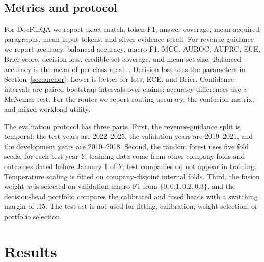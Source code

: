 \documentclass[11pt]{article}
\begin{document}
\subsection{Metrics and protocol}
For DocFinQA we report exact match, token F1, answer coverage, mean acquired paragraphs, mean input tokens, and silver evidence recall. For revenue guidance we report accuracy, balanced accuracy, macro F1, MCC, AUROC, AUPRC, ECE, Brier score, decision loss, credible-set coverage, and mean set size. Balanced accuracy is the mean of per-class recall \citep{brodersen2010balanced,sokolova2009performance}. Decision loss uses the parameters in Section~\ref{sec:anchor}. Lower is better for loss, ECE, and Brier. Confidence intervals are paired bootstrap intervals over claims; accuracy differences use a McNemar test. For the router we report routing accuracy, the confusion matrix, and mixed-workload utility.

The evaluation protocol has three parts. First, the revenue-guidance split is temporal; the test years are 2022--2025, the validation years are 2019--2021, and the development years are 2010--2018. Second, the random forest uses five fold seeds; for each test year $Y$, training data come from other company folds and outcomes dated before January 1 of $Y$; test companies do not appear in training. Temperature scaling is fitted on company-disjoint internal folds. Third, the fusion weight $w$ is selected on validation macro F1 from $\{0,0.1,0.2,0.3\}$, and the decision-head portfolio compares the calibrated and fused heads with a switching margin of .15. The test set is not used for fitting, calibration, weight selection, or portfolio selection.

\section{Results}
\label{sec:results}
\end{document}
